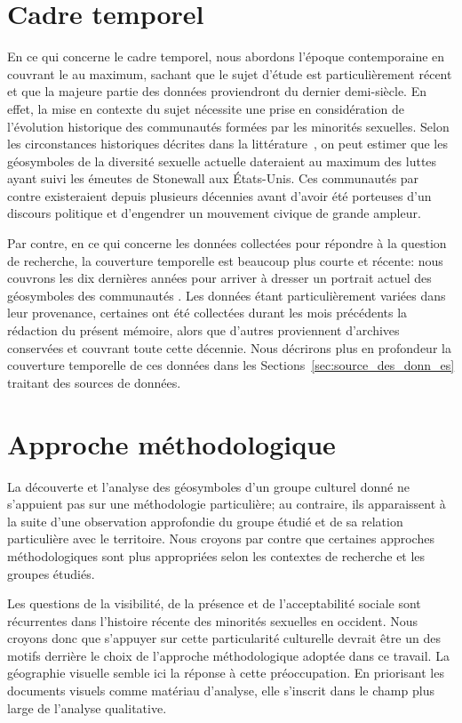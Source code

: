 \section{Cadre temporel}
\label{sec:cadre_temporel}

En ce qui concerne le cadre temporel, nous abordons l'époque contemporaine en couvrant le  au maximum, sachant que le sujet d'étude est particulièrement récent et que la majeure partie des données proviendront du dernier demi-siècle.
En effet, la mise en contexte du sujet nécessite une prise en considération de l'évolution historique des communautés formées par les minorités sexuelles.
Selon les circonstances historiques décrites dans la littérature~\citep{Spencer2005}, on peut estimer que les géosymboles de la diversité sexuelle actuelle dateraient au maximum des luttes ayant suivi les émeutes de Stonewall aux États-Unis.
Ces communautés par contre existeraient depuis plusieurs décennies avant d'avoir été porteuses d'un discours politique et d'engendrer un mouvement civique de grande ampleur.

Par contre, en ce qui concerne les données collectées pour répondre à la question de recherche, la couverture temporelle est beaucoup plus courte et récente: nous couvrons les dix dernières années pour arriver à dresser un portrait actuel des géosymboles des communautés \lgbt{}.
Les données étant particulièrement variées dans leur provenance, certaines ont été collectées durant les mois précédents la rédaction du présent mémoire, alors que d'autres proviennent d'archives conservées et couvrant toute cette décennie.
Nous décrirons plus en profondeur la couverture temporelle de ces données dans les Sections~\ref{sec:source_des_donn_es} traitant des sources de données.

\section{Approche méthodologique}
\label{sec:approche_m_thodologique}

La découverte et l'analyse des géosymboles d'un groupe culturel donné ne s'appuient pas sur une méthodologie particulière; au contraire, ils apparaissent à la suite d'une observation approfondie du groupe étudié et de sa relation particulière avec le territoire.
Nous croyons par contre que certaines approches méthodologiques sont plus appropriées selon les contextes de recherche et les groupes étudiés.

Les questions de la visibilité, de la présence et de l'acceptabilité sociale sont récurrentes dans l'histoire récente des minorités sexuelles en occident.
Nous croyons donc que s'appuyer sur cette particularité culturelle devrait être un des motifs derrière le choix de l'approche méthodologique adoptée dans ce travail.
La géographie visuelle semble ici la réponse à cette préoccupation.
En priorisant les documents visuels comme matériau d'analyse, elle s'inscrit dans le champ plus large de l'analyse qualitative.

